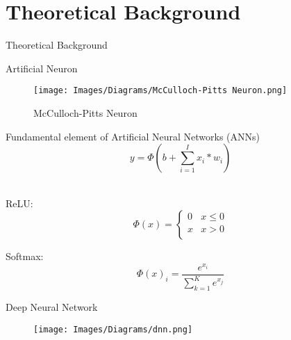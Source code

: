 \setlength{\parskip}{\baselineskip}
\section{Theoretical Background}

\begin{frame}
	\huge Theoretical Background
\end{frame}

\begin{frame}{Artificial Neuron}
	\begin{minipage}{0.3\textwidth}
        \begin{figure}[H]
            \centering
    		\texttt{[image: Images/Diagrams/McCulloch-Pitts Neuron.png]}\\
    		\caption{McCulloch-Pitts Neuron}
    	 \end{figure}
	\end{minipage}%
	\begin{minipage}{0.7\textwidth}
        Fundamental element of Artificial Neural Networks (ANNs)
        \begin{equation*}
        	y = \Phi( b + \sum_{i=1}^{I}x_i*w_i )
        \end{equation*}\\
        
    	\begin{minipage}{0.5\textwidth}
            \centering
            ReLU:
            \begin{equation*}
                \Phi\left( x \right) = \left\{
                	\begin{array}{ll}
                	    0 & x \leq 0\\
                	    x & x > 0\\
                	\end{array} \right.
            \end{equation*}
    	\end{minipage}%
    	\begin{minipage}{0.5\textwidth}
            \centering
            Softmax:
            \begin{equation*}
                \Phi\left( x \right)_{i} = \frac{e^{x_i}}{\sum_{k=1}^{K}e^{x_{j}}}
            \end{equation*}
    	\end{minipage}%
	\end{minipage}%
\end{frame}

\begin{frame}{Deep Neural Network}
    \begin{figure}[H]
        \centering
		\texttt{[image: Images/Diagrams/dnn.png]}
	 \end{figure}
\end{frame}

